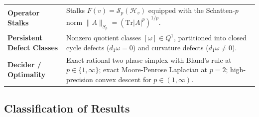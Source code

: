\documentclass[
]{article}
\begin{document}
\begin{longtable}[]{@{}
  >{\raggedright\arraybackslash}p{}
  >{\raggedright\arraybackslash}p{}@{}}
\textbf{Operator Stalks} & Stalks \(F(v) = \mathcal{S}_p(\mathcal{H}_v)\) equipped with the Schatten-\(p\) norm \(\|A\|_{S_p} = (\mathrm{Tr}|A|^p)^{1/p}\). \\
\textbf{Persistent Defect Classes} & Nonzero quotient classes \([\omega] \in Q^1\), partitioned into closed cycle defects (\(d_1 \omega = 0\)) and curvature defects (\(d_1 \omega \ne 0\)). \\
\textbf{Decider / Optimality} & Exact rational two-phase simplex with Bland's rule at \(p \in \{1, \infty\}\); exact Moore-Penrose Laplacian at \(p=2\); high-precision convex descent for \(p \in (1, \infty)\). \\
\end{longtable}

\subsection{Classification of Results}\label{classification-of-results}
\end{document}
